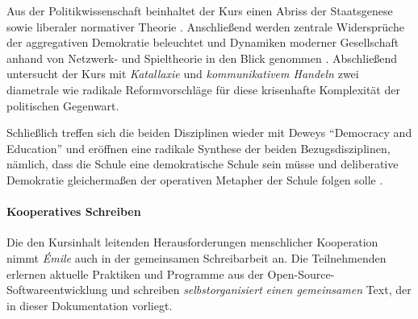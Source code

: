 Aus der Politikwissenschaft beinhaltet der Kurs einen Abriss der Staatsgenese \parencite{Tilly-1985-aa} sowie liberaler normativer Theorie \parencites{Dahl-1989-aa}.
Anschließend werden zentrale Widersprüche \parencite{Condorcet1785,Arrow1950} der aggregativen Demokratie beleuchtet und Dynamiken moderner Gesellschaft anhand von Netzwerk- und Spieltheorie in den Blick genommen \parencite{Kleinberg-2009-oz}.
Abschließend untersucht der Kurs mit \emph{Katallaxie} \parencite{hayek-1945} und \emph{kommunikativem Handeln} \parencite{Habermas-1998-aa} zwei diametrale wie radikale Reformvorschläge für diese krisenhafte Komplexität der politischen Gegenwart.

Schließlich treffen sich die beiden Disziplinen wieder mit Deweys ``Democracy and Education'' \parencite*{Dewey-1916} und eröffnen eine radikale Synthese der beiden Bezugsdisziplinen, nämlich, dass die Schule eine demokratische Schule sein müsse und deliberative Demokratie gleichermaßen der operativen Metapher der Schule folgen solle \parencite{Rosenberg-2002-aa}.



\paragraph{Kooperatives Schreiben}

Die den Kursinhalt leitenden Herausforderungen menschlicher Kooperation nimmt \emph{Émile} auch in der gemeinsamen Schreibarbeit an.
Die Teilnehmenden erlernen aktuelle Praktiken und Programme aus der Open-Source-Softwareentwicklung und schreiben \emph{selbstorganisiert} \emph{einen gemeinsamen} Text, der in dieser Dokumentation vorliegt.